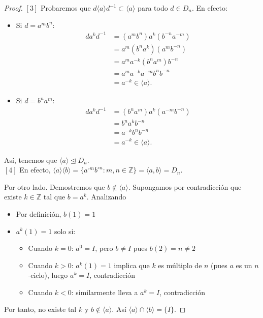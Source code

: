 \begin{proof}
	
	\noindent $[3]$ Probaremos que $d\langle a\rangle d^{-1}\subset \langle a\rangle$ para todo $d\in D_n$. En efecto:
	\begin{itemize}
		\item Si $d=a^mb^n$:   	
		\begin{align*}
			da^k d^{-1} 
			&= (a^m b^n) a^k (b^{-n} a^{-m}) \\
			&= a^m (b^n a^k) (a^{m} b^{-n}) \\
			&= a^m a^{-k} (b^n a^{m}) b^{-n} \\
			&= a^m a^{-k} a^{-m} b^n b^{-n} \\
			&= a^{-k} \in \langle a \rangle.
		\end{align*}
		
		\item Si $d=b^na^m$: 
		\begin{align*}
			da^k d^{-1} 
			&= (b^n a^m) a^k (a^{-m} b^{-n}) \\
			&= b^na^{k}b^{-n} \\
			&= a^{-k} b^n b^{-n} \\
			&= a^{-k} \in \langle a \rangle.
		\end{align*}
	\end{itemize}    
	Así, tenemos que $\langle a\rangle \trianglelefteq D_n$.\\ 
	
	\noindent $[4]$ En efecto, $\langle a\rangle \langle b \rangle=\{a^{\circ m}b^{\circ n}:m,n\in\mathbb{Z}\}=\langle a,b\rangle=D_n$.
	
	\medskip
	\noindent Por otro lado. Demostremos que $b \notin \langle a \rangle$. Supongamos por contradicción que existe $k \in \mathbb{Z}$ tal que $b = a^k$. Analizando
	\begin{itemize}
		\item Por definición, $b(1) = 1$
		\item $a^k(1) = 1$ solo si:
		\begin{itemize}
			\item Cuando $k = 0$: $a^0 = I$, pero $b \neq I$ pues $b(2) = n \neq 2$
			\item Cuando $k > 0$: $a^k(1) = 1$ implica que $k$ es múltiplo de $n$ (pues $a$ es un $n$-ciclo), luego $a^k = I$, contradicción
			\item Cuando $k < 0$: similarmente lleva a $a^k = I$, contradicción
		\end{itemize}
	\end{itemize}
	Por tanto, no existe tal $k$ y $b \notin \langle a \rangle$. Así $\langle a\rangle \cap \langle b\rangle=\{I\}$.
	
	
\end{proof}

